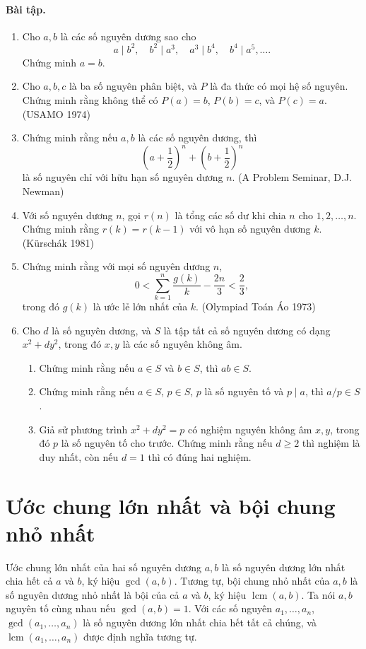 \documentclass[11pt]{article}
\DeclareMathOperator{\lcm}{lcm}
\begin{document}
\paragraph{Bài tập.}
\begin{enumerate}
\item Cho \(a,b\) là các số nguyên dương sao cho
\[
 a\mid b^2,\quad b^2\mid a^3,\quad a^3\mid b^4,\quad b^4\mid a^5,\ldots.
\]
Chứng minh \(a=b\).
\item Cho \(a,b,c\) là ba số nguyên phân biệt, và \(P\) là đa thức có mọi hệ
số nguyên. Chứng minh rằng không thể có \(P(a)=b\), \(P(b)=c\), và \(P(c)=a\).
(USAMO 1974)
\item Chứng minh rằng nếu \(a,b\) là các số nguyên dương, thì
\[
 \left(a+\frac12\right)^n+\left(b+\frac12\right)^n
\]
là số nguyên chỉ với hữu hạn số nguyên dương \(n\). (A Problem Seminar, D.J.
Newman)
\item Với số nguyên dương \(n\), gọi \(r(n)\) là tổng các số dư khi chia \(n\)
cho \(1,2,\ldots,n\). Chứng minh rằng \(r(k)=r(k-1)\) với vô hạn số nguyên
dương \(k\). (Kürschák 1981)
\item Chứng minh rằng với mọi số nguyên dương \(n\),
\[
 0<\sum_{k=1}^n\frac{g(k)}{k}-\frac{2n}{3}<\frac23,
\]
trong đó \(g(k)\) là ước lẻ lớn nhất của \(k\). (Olympiad Toán Áo 1973)
\item Cho \(d\) là số nguyên dương, và \(S\) là tập tất cả số nguyên dương có
dạng \(x^2+dy^2\), trong đó \(x,y\) là các số nguyên không âm.
\begin{enumerate}[label=(\alph*)]
\item Chứng minh rằng nếu \(a\in S\) và \(b\in S\), thì \(ab\in S\).
\item Chứng minh rằng nếu \(a\in S\), \(p\in S\), \(p\) là số nguyên tố và
\(p\mid a\), thì \(a/p\in S\).
\item Giả sử phương trình \(x^2+dy^2=p\) có nghiệm nguyên không âm \(x,y\),
trong đó \(p\) là số nguyên tố cho trước. Chứng minh rằng nếu \(d\ge2\) thì
nghiệm là duy nhất, còn nếu \(d=1\) thì có đúng hai nghiệm.
\end{enumerate}
\end{enumerate}

\section{Ước chung lớn nhất và bội chung nhỏ nhất}

Ước chung lớn nhất của hai số nguyên dương \(a,b\) là số nguyên dương lớn nhất
chia hết cả \(a\) và \(b\), ký hiệu \(\gcd(a,b)\). Tương tự, bội chung nhỏ
nhất của \(a,b\) là số nguyên dương nhỏ nhất là bội của cả \(a\) và \(b\), ký
hiệu \(\lcm(a,b)\). Ta nói \(a,b\) nguyên tố cùng nhau nếu \(\gcd(a,b)=1\).
Với các số nguyên \(a_1,\ldots,a_n\), \(\gcd(a_1,\ldots,a_n)\) là số nguyên
dương lớn nhất chia hết tất cả chúng, và \(\lcm(a_1,\ldots,a_n)\) được định
nghĩa tương tự.
\end{document}
